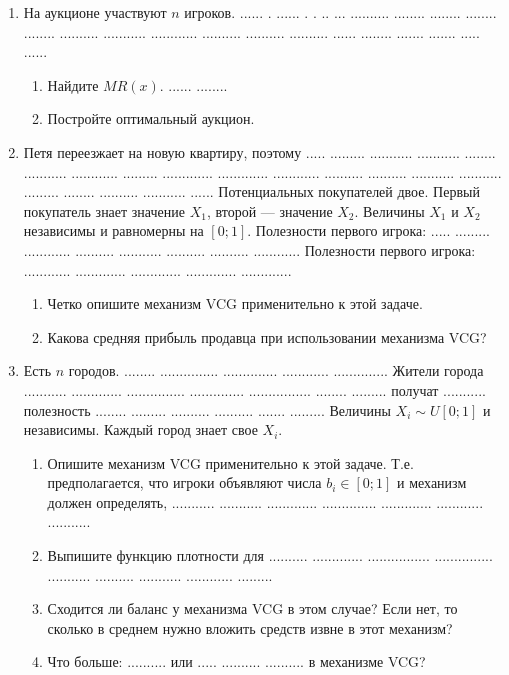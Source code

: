 \documentclass[pdftex,12pt,a4paper]{article}
\begin{document}
\begin{enumerate}

\item На аукционе участвуют $ n $ игроков. ...... . ...... . . .. ... .......... ........ ........ ........ ........ .......... ........... ............ .......... .......... .......... ...... ........ ....... ....... ..... ......
\begin{enumerate}
\item Найдите $ MR(x) $. ...... ........
\item Постройте оптимальный аукцион.
\end{enumerate}

\item Петя переезжает на новую квартиру, поэтому ..... ......... ........... ........... ........ ........... ............ ......... ............. ............. ............ .......... .......... ........... ........... ......... ........ .......... ........... ...... Потенциальных покупателей двое. Первый покупатель знает значение $ X_{1} $, второй --- значение $ X_{2} $. Величины  $ X_{1} $ и  $ X_{2} $ независимы и равномерны на $ [0;1] $. Полезности первого игрока: ..... ......... ............ .......... ........... .......... .......... ............ Полезности первого игрока: ............ ............. ............. ............. .............
\begin{enumerate}
\item Четко опишите механизм VCG применительно к этой задаче.
\item Какова средняя прибыль продавца при использовании механизма VCG?
\end{enumerate}


\item Есть $ n $ городов. ........ ............... .............. ............ .............. Жители города ........... ............. ............... .............. ................ ........ ......... получат ........... полезность ........ ......... .......... .......... ....... .........  Величины $ X_{i}\sim U[0;1] $ и независимы. Каждый город знает свое $ X_{i} $. 
\begin{enumerate}
\item Опишите механизм VCG применительно к этой задаче. Т.е. предполагается, что игроки объявляют числа $ b_{i}\in [0;1] $ и механизм должен определять, ........... ........... ............. .............. ............. ............ ...........
\item Выпишите функцию плотности для .......... ............. ................ ............... ........... .......... ........... ............ .........
\item Сходится ли баланс у механизма VCG в этом случае? Если нет, то сколько в среднем нужно вложить средств извне в этот механизм?
\item Что больше: .......... или ..... .......... .......... в механизме VCG?
\end{enumerate}



\end{enumerate}
\end{document}
